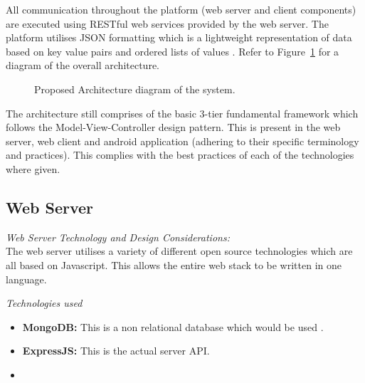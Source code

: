 \documentclass[12pt]{witseiepaper}
\begin{document}
All communication throughout the platform (web server and client components) are executed using RESTful web services provided by the web server. The platform utilises JSON formatting which is a lightweight representation of data based on key value pairs and ordered lists of values \cite{JSON}. Refer to Figure~\ref{fig:Arch} for a diagram of the overall architecture.

\begin{figure}[H]
  \caption{Proposed Architecture diagram of the system.} 
  \label{fig:Arch}
\end{figure}

The architecture still comprises of the basic 3-tier fundamental framework which follows the Model-View-Controller design pattern. This is present in the web server, web client and android application (adhering to their specific terminology and practices). This complies with the best practices of each of the technologies where given.


\subsection{Web Server}
\textit{Web Server Technology and Design Considerations:} \\
The web server utilises a variety of different open source technologies which are all based on Javascript. This allows the entire web stack to be written in one language.

\emph{Technologies used} 
\begin{itemize}
  \item \textbf{MongoDB:} This is a non relational database which would be used .
  \item \textbf{ExpressJS:} This is the actual server API.
  \item \
\end{itemize}
\end{document}
